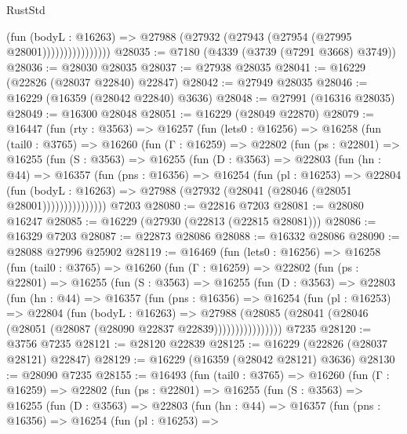 \begin{lexlean}{RustStd}
\begin{coremodule}
                          (fun (bodyL : @16263) =>
                          @27988 (@27932 (@27943 (@27954 (@27995 @28001))))))))))))))))
@28035 := @7180 (@4339 (@3739 (@7291 @3668) @3749))
@28036 := @28030 @28035
@28037 := @27938 @28035
@28041 := @16229 (@22826 (@28037 @22840) @22847)
@28042 := @27949 @28035
@28046 := @16229 (@16359 (@28042 @22840) @3636)
@28048 := @27991 (@16316 @28035)
@28049 := @16300 @28048
@28051 := @16229 (@28049 @22870)
@28079 := @16447
    (fun (rty : @3563) =>
    @16257
      (fun (lets0 : @16256) =>
      @16258
        (fun (tail0 : @3765) =>
        @16260
          (fun (Γ : @16259) =>
          @22802
            (fun (ps : @22801) =>
            @16255
              (fun (S : @3563) =>
              @16255
                (fun (D : @3563) =>
                @22803
                  (fun (hn : @44) =>
                  @16357
                    (fun (pns : @16356) =>
                    @16254
                      (fun (pl : @16253) =>
                      @22804
                        (fun (bodyL : @16263) =>
                        @27988 (@27932 (@28041 (@28046 (@28051 @28001)))))))))))))))
    @7203
@28080 := @22816 @7203
@28081 := @28080 @16247
@28085 := @16229 (@27930 (@22813 (@22815 @28081)))
@28086 := @16329 @7203
@28087 := @22873 @28086
@28088 := @16332 @28086
@28090 := @28088 @27996 @25902
@28119 := @16469
    (fun (lets0 : @16256) =>
    @16258
      (fun (tail0 : @3765) =>
      @16260
        (fun (Γ : @16259) =>
        @22802
          (fun (ps : @22801) =>
          @16255
            (fun (S : @3563) =>
            @16255
              (fun (D : @3563) =>
              @22803
                (fun (hn : @44) =>
                @16357
                  (fun (pns : @16356) =>
                  @16254
                    (fun (pl : @16253) =>
                    @22804
                      (fun (bodyL : @16263) =>
                      @27988
                        (@28085
                          (@28041 (@28046 (@28051 (@28087 (@28090 @22837 @22839))))))))))))))))
    @7235
@28120 := @3756 @7235
@28121 := @28120 @22839
@28125 := @16229 (@22826 (@28037 @28121) @22847)
@28129 := @16229 (@16359 (@28042 @28121) @3636)
@28130 := @28090 @7235
@28155 := @16493
    (fun (tail0 : @3765) =>
    @16260
      (fun (Γ : @16259) =>
      @22802
        (fun (ps : @22801) =>
        @16255
          (fun (S : @3563) =>
          @16255
            (fun (D : @3563) =>
            @22803
              (fun (hn : @44) =>
              @16357
                (fun (pns : @16356) =>
                @16254
                  (fun (pl : @16253) =>

\end{coremodule}
\end{lexlean}
